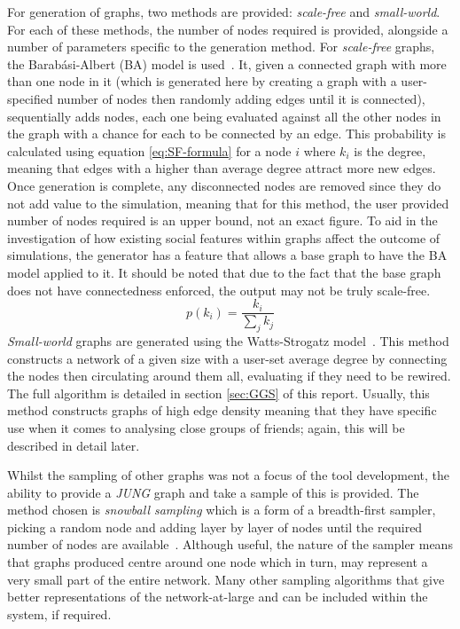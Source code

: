 \documentclass[]{report}
\begin{document}
For generation of graphs, two methods are provided: \emph{scale-free} and \emph{small-world}. For each of these methods, the number of nodes required is provided, alongside a number of parameters specific to the generation method. For \emph{scale-free} graphs, the Barab\'{a}si-Albert (BA) model is used~\cite{BAStat}. It, given a connected graph with more than one node in it (which is generated here by creating a graph with a user-specified number of nodes then randomly adding edges until it is connected), sequentially adds nodes, each one being evaluated against all the other nodes in the graph with a chance for each to be connected by an edge. This probability is calculated using equation \ref{eq:SF-formula} for a node $i$ where $k_{i}$ is the degree, meaning that edges with a higher than average degree attract more new edges. Once generation is complete, any disconnected nodes are removed since they do not add value to the simulation, meaning that for this method, the user provided number of nodes required is an upper bound, not an exact figure. To aid in the investigation of how existing social features within graphs affect the outcome of simulations, the generator has a feature that allows a base graph to have the BA model applied to it. It should be noted that due to the fact that the base graph does not have connectedness enforced, the output may not be truly scale-free. 
\begin{equation}
p(k_{i}) = \frac{k_{i}}{\sum\limits_{j}k_{j}}
\label{eq:SF-formula}
\end{equation}
\emph{Small-world} graphs are generated using the Watts-Strogatz model~\cite{BAStat}. This method constructs a network of a given size with a user-set average degree by connecting the nodes then circulating around them all, evaluating if they need to be rewired. The full algorithm is detailed in section \ref{sec:GGS} of this report. Usually, this method constructs graphs of high edge density meaning that they have specific use when it comes to analysing close groups of friends; again, this will be described in detail later.

Whilst the sampling of other graphs was not a focus of the tool development, the ability to provide a \emph{JUNG} graph and take a sample of this is provided. The method chosen is \emph{snowball sampling} which is a form of a breadth-first sampler, picking a random node and adding layer by layer of nodes until the required number of nodes are available~\cite{snowball}. Although useful, the nature of the sampler means that graphs produced centre around one node which in turn, may represent a very small part of the entire network. Many other sampling algorithms that give better representations of the network-at-large and can be included within the system, if required.
\end{document}
